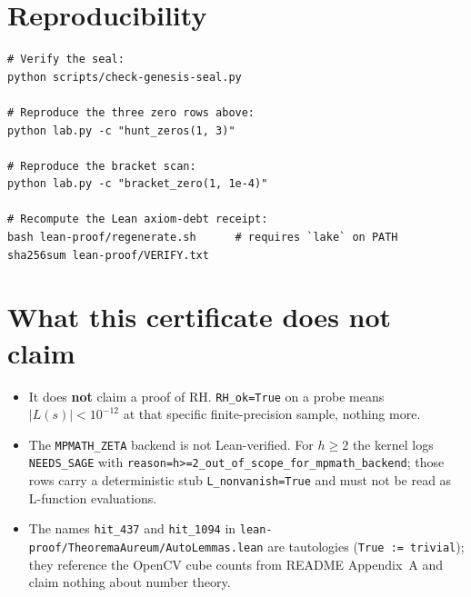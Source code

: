 \documentclass[11pt]{article}
\begin{document}
\section*{Reproducibility}
\begin{lstlisting}
# Verify the seal:
python scripts/check-genesis-seal.py

# Reproduce the three zero rows above:
python lab.py -c "hunt_zeros(1, 3)"

# Reproduce the bracket scan:
python lab.py -c "bracket_zero(1, 1e-4)"

# Recompute the Lean axiom-debt receipt:
bash lean-proof/regenerate.sh      # requires `lake` on PATH
sha256sum lean-proof/VERIFY.txt
\end{lstlisting}

\section*{What this certificate does \textbf{not} claim}
\begin{itemize}
  \item It does \textbf{not} claim a proof of RH. \verb|RH_ok=True| on
        a probe means $|L(s)| < 10^{-12}$ at that specific
        finite-precision sample, nothing more.
  \item The \texttt{MPMATH\_ZETA} backend is not Lean-verified.
        For $h\!\ge\!2$ the kernel logs \texttt{NEEDS\_SAGE} with
        \verb|reason=h>=2_out_of_scope_for_mpmath_backend|; those
        rows carry a deterministic stub \verb|L_nonvanish=True| and
        must not be read as L-function evaluations.
  \item The names \texttt{hit\_437} and \texttt{hit\_1094} in
        \texttt{lean-proof/TheoremaAureum/AutoLemmas.lean} are
        tautologies (\texttt{True := trivial}); they reference the
        OpenCV cube counts from README Appendix~A and claim nothing
        about number theory.
\end{itemize}
\end{document}
